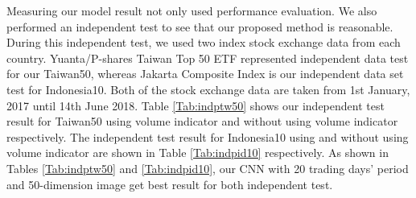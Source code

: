 \documentclass[12pt]{article}
\begin{document}
  \begin{table}[H]
 \centering
 \caption{Summary result of Taiwan 50 with their best classifier for each trading days and image dimension.}
 \label{Tab:indpid10}
 \end{table}
Measuring our model result not only used performance evaluation. We also performed an independent test to see that our proposed method is reasonable. During this independent test, we used two index stock exchange data from each country. Yuanta/P-shares Taiwan Top 50 ETF represented independent data test for our Taiwan50, whereas Jakarta Composite Index is our independent data set test for Indonesia10. Both of the stock exchange data are taken from 1st January, 2017 until 14th June 2018. 
Table \ref{Tab:indptw50} shows our independent test result for Taiwan50 using volume indicator and without using volume indicator respectively. The independent test result for Indonesia10 using and without using volume indicator are shown in Table \ref{Tab:indpid10} respectively. As shown in Tables \ref{Tab:indptw50} and \ref{Tab:indpid10}, our CNN with 20 trading days’ period and 50-dimension image get best result for both independent test.
\end{document}

